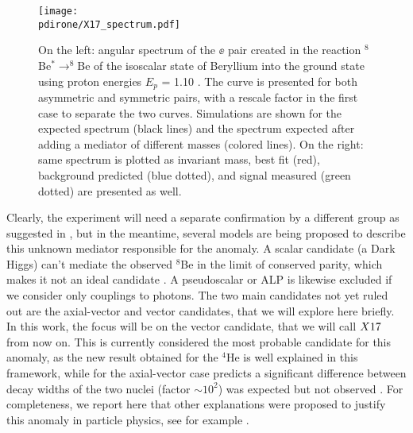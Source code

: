 \begin{figure}[htb!]
  \centering
  \texttt{[image: \\pdirone/X17\_spectrum.pdf]}
  \caption[$^8$Be anomaly]{On the left: angular spectrum of the $\ee$ pair created in the reaction $^8$Be$^* \to ^8$Be of the isoscalar state of Beryllium into the ground state using proton energies $E_p$ = 1.10 \mev. The curve is presented for both asymmetric and symmetric pairs, with a rescale factor in the first case to separate the two curves. Simulations are shown for the expected spectrum (black lines) and the spectrum expected after adding a mediator of different masses (colored lines). On the right: same spectrum is plotted as invariant mass, best fit (red), background predicted (blue dotted), and signal measured (green dotted) are presented as well. \cite{Krasznahorkay:2015iga}}
  \label{fig:be-anomaly}
\end{figure}

Clearly, the experiment will need a separate confirmation by a different group as suggested in \cite{Feng:2020mbt}, but in the meantime, several models are being proposed to describe this unknown mediator responsible for the anomaly. A scalar candidate (a Dark Higgs) can't mediate the observed $^8$Be in the limit of conserved parity, which makes it not an ideal candidate \cite{PhysRevD.95.035017}. A pseudoscalar or ALP is likewise excluded if we consider only couplings to photons. The two main candidates not yet ruled out are the axial-vector and vector candidates, that we will explore here briefly. In this work, the focus will be on the vector candidate, that we will call $X17$ from now on. This is currently considered the most probable candidate for this anomaly, as the new result obtained for the $^4$He is well explained in this framework, while for the axial-vector case predicts a significant difference between decay widths of the two nuclei (factor $\sim10^2$) was expected but not observed \cite{Feng:2020mbt}. For completeness, we report here that other explanations were proposed to justify this anomaly in particle physics, see for example \cite{Nam:2019osu, Seto:2016pks}.

